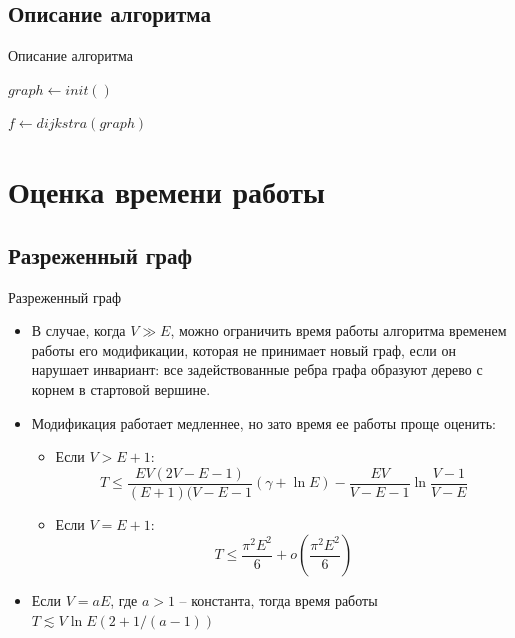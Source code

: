 \documentclass{beamer}
\begin{document}
 \subsection{Описание алгоритма}
 \begin{frame}{Описание алгоритма}
  \begin{algorithm}[H]
  
  $graph \gets init()$
  
  $f \gets dijkstra(graph)$
  
  \end{algorithm}
 \end{frame}
 
 \section{Оценка времени работы}
 \subsection{Разреженный граф}
 \begin{frame}{Разреженный граф}
  \begin{itemize}
   \item В случае, когда $V \gg E$, можно ограничить время работы алгоритма временем работы его модификации, которая не принимает новый граф, если он нарушает инвариант: все задействованные ребра графа образуют дерево с корнем в стартовой вершине.
   \item Модификация работает медленнее, но зато время ее работы проще оценить:
   \begin{itemize}
    \item Если $V > E + 1$:
    $$T \le \frac{EV(2V - E - 1)}{(E + 1)(V - E - 1}(\gamma + \ln E) - \frac{EV}{V - E - 1} \ln\frac{V - 1}{V - E}$$
    \item Если $V = E + 1$:
    $$T \le \frac{\pi^2 E^2}{6} + o\left( \frac{\pi^2 E^2}{6} \right)$$
   \end{itemize}
   \item Если $V = aE$, где $a > 1$ -- константа, тогда время работы $T \lesssim V \ln{E} \left(2 + 1/(a - 1)\right)$
  \end{itemize}
 \end{frame}
\end{document}
